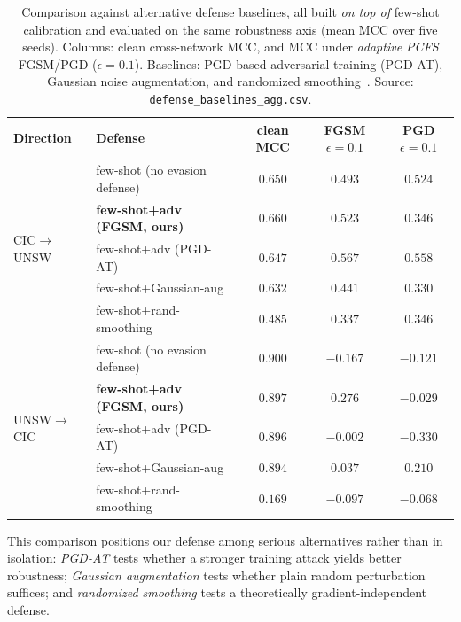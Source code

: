 \documentclass[preprint,12pt,authoryear]{elsarticle}
\begin{document}
\begin{table}[h]
\centering
\caption{Comparison against alternative defense baselines, all built \emph{on top of}
few-shot calibration and evaluated on the same robustness axis (mean MCC over five
seeds). Columns: clean cross-network MCC, and MCC under \emph{adaptive PCFS} FGSM/PGD
($\epsilon{=}0.1$). Baselines: PGD-based adversarial training (PGD-AT), Gaussian
noise augmentation, and randomized smoothing~\citep{cohen2019smoothing}. Source:
\texttt{defense\_baselines\_agg.csv}.}
\label{tab:defense_baselines}
\small
\begin{tabular}{llccc}
\toprule
Direction & Defense & clean MCC & FGSM $\epsilon{=}0.1$ & PGD $\epsilon{=}0.1$ \\
\midrule
\multirow{5}{*}{CIC$\rightarrow$UNSW}
 & few-shot (no evasion defense)       & $0.650$ & $0.493$ & $0.524$ \\
 & \textbf{few-shot+adv (FGSM, ours)}  & $0.660$ & $0.523$ & $0.346$ \\
 & few-shot+adv (PGD-AT)               & $0.647$ & $0.567$ & $0.558$ \\
 & few-shot+Gaussian-aug               & $0.632$ & $0.441$ & $0.330$ \\
 & few-shot+rand-smoothing             & $0.485$ & $0.337$ & $0.346$ \\
\midrule
\multirow{5}{*}{UNSW$\rightarrow$CIC}
 & few-shot (no evasion defense)       & $0.900$ & $-0.167$ & $-0.121$ \\
 & \textbf{few-shot+adv (FGSM, ours)}  & $0.897$ & $0.276$ & $-0.029$ \\
 & few-shot+adv (PGD-AT)               & $0.896$ & $-0.002$ & $-0.330$ \\
 & few-shot+Gaussian-aug               & $0.894$ & $0.037$ & $0.210$ \\
 & few-shot+rand-smoothing             & $0.169$ & $-0.097$ & $-0.068$ \\
\bottomrule
\end{tabular}
\end{table}

\noindent This comparison positions our defense among serious alternatives rather
than in isolation: \emph{PGD-AT} tests whether a stronger training attack yields
better robustness; \emph{Gaussian augmentation} tests whether plain random
perturbation suffices; and \emph{randomized smoothing} tests a theoretically
gradient-independent defense.
\end{document}
